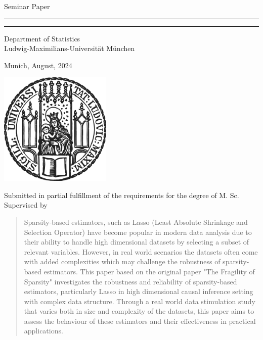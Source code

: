 \begin{titlepage}
\begin{center}
    
\LARGE
Seminar Paper
    
\vspace{0.5cm}
      
\rule{\textwidth}{1.5pt}
\LARGE
\textbf{\mytitle}
\rule{\textwidth}{1.5pt}
   
\vspace{0.5cm}
      
\large
Department of Statistics \\
Ludwig-Maximilians-Universität München 

\vfill

\Large
\textbf{\myname}

\vfill

\large
Munich, August, 2024
      
\vfill

\includegraphics[width = 0.4\textwidth]{sigillum.png}

\vfill

\normalsize
Submitted in partial fulfillment of the requirements for the degree of M. Sc.
\\

Supervised by \mysupervisor

\end{center}
\end{titlepage}


\newpage

\begin{abstract}
Sparsity-based estimators, such as Lasso (Least Absolute Shrinkage and Selection Operator) have become popular in modern data analysis due to their ability to handle high dimensional datasets by selecting a subset of relevant variables. However, in real world scenarios the datasets often come with added complexities which may challenge the robustness of sparsity-based estimators. This paper based on the original paper "The Fragility of Sparsity" investigates the robustness and reliability of sparsity-based estimators, particularly Lasso in high dimensional causal inference setting with complex data structure. Through a real world data stimulation study that varies both in size and complexity of the datasets, this paper aims to assess the behaviour of these estimators and their effectiveness in practical applications. 

\end{abstract}

